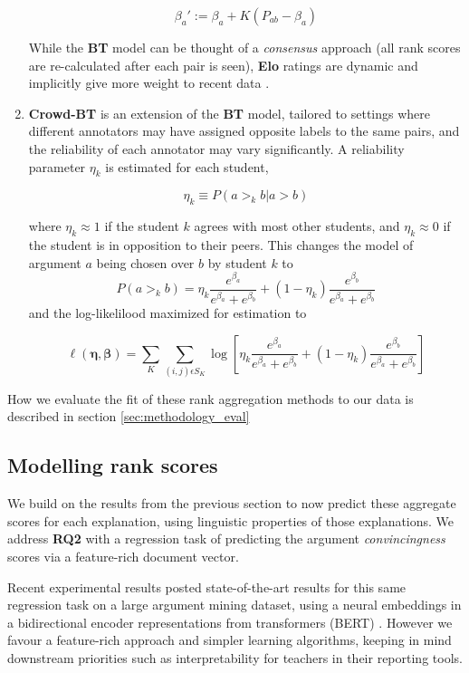 \documentclass[notitlepage,12pt]{jedm}
\begin{document}
\begin{enumerate}
	$$
	\beta_a':=\beta_a+K(P_{ab} - \beta_a)
	$$
	
	While the \textbf{BT} model can be thought of a \textit{consensus} 
	approach (all rank scores are re-calculated after each pair is seen), 
	\textbf{Elo} ratings are dynamic and implicitly give more weight 
	to recent data \cite{aldous_elo_2017}.
	
	\item \textbf{Crowd-BT} \cite{chen_pairwise_2013} is an extension of the 
	\textbf{BT} model, tailored to settings where different annotators may have 
	assigned opposite labels to the same pairs, and the reliability of each 
	annotator may vary significantly. 
	A reliability parameter $\eta_k$ is estimated for each student, 
	
	$$
	\eta_k \equiv P(a >_k b | a >b )
	$$
	
	where $\eta_k \approx 1$ if the student  $k$ agrees with most other 
	students, and $\eta_k \approx 0$ if the student is in opposition to their 
	peers.
	This changes the model of argument $a$ being chosen over $b$ by student $k$ 
	to 
	$$
	P(a >_k b) = 
	\eta_k \frac{e^{\beta_a}}{e^{\beta_a}+e^{\beta_b}} + (1-\eta_k) 
	\frac{e^{\beta_b}}{e^{\beta_a}+e^{\beta_b}}
	$$
	and the log-likelilood maximized for estimation to 
	
	$$
	\ell(\boldsymbol{\eta},\boldsymbol{\beta})=\sum_{K}\sum_{(i,j)\epsilon 
		S_K}^{} 
	\log \left[ \eta_k \frac{e^{\beta_a}}{e^{\beta_a}+e^{\beta_b}} + (1-\eta_k) 
	\frac{e^{\beta_b}}{e^{\beta_a}+e^{\beta_b}} \right]
	$$
	
\end{enumerate}

How we evaluate the fit of these rank aggregation methods to our data is 
described in section \ref{sec:methodology_eval}

\subsection{Modelling rank scores}\label{sec:features}
We build on the results from the previous section to now predict these 
aggregate scores for each explanation, using linguistic properties of those 
explanations.
We address \textbf{RQ2} with a regression task of predicting the argument 
\textit{convincingness} scores via a feature-rich document vector.

Recent experimental results posted state-of-the-art results for this same 
regression task on a large argument mining dataset, using a neural embeddings 
in a bidirectional encoder representations from transformers (BERT) 
\cite{gretz_large-scale_2019}.
However we favour a feature-rich approach and simpler learning algorithms, 
keeping in mind downstream priorities such as interpretability for teachers in 
their reporting tools.
\end{document}
